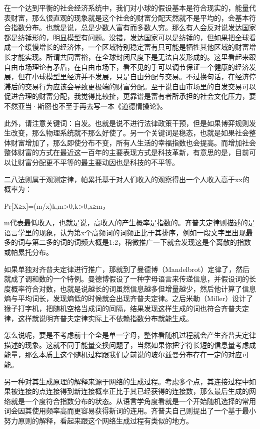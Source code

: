 \documentclass[
]{book}
\begin{document}
在一个达到平衡的社会经济系统中，我们对小球的假设基本是符合现实的，能量代表财富，那么很直观的现象就是这个社会的财富分配天然就不是平均的，会基本符合指数分布。也就是说，总是少数人富有而多数人穷。那么有人会反对说发达国家都是纺锤形的，明显模型有问题。没错，发达国家可以是纺锤的，但如果把全球看成一个缓慢增长的经济体，一个区域特别稳定富有只可能是牺牲其他区域的财富增长才能实现。所谓共同富裕，在全球封闭尺度下是无法自发形成的。这里看起来跟自由市场理论有矛盾，在自由市场下，看不见的手可以调节保证一个健康的经济发展，但在小球模型里经济并不发展，只是自由分配与交易。不过换句话，在经济停滞后的交易行为应该会导致更极端的财富分配。至于说自由市场里的自发交易可以促进合理的财富分配，我觉得比较扯，更靠谱是富有者所承担的社会文化压力，要不然亚当·斯密也不至于再去写一本《道德情操论》。

此外，请注意关键词：自发。也就是说不进行法律政策干预，但是如果博弈规则发生改变，那么物理系统就不那么好使了。另一个关键词是稳态，也就是如果社会整体财富增加了，那么即使分布不变，所有人生活的幸福指数也会提高。而增加社会整体财富的方式在最近这一百年的主要表现方式是科技革新，有意思的是，目前可以让财富分配更不平等的最主要动因也是科技的不平等。

二八法则属于观测定律，帕累托基于对人们收入的观察得出一个人收入高于xx的概率为：

Pr{[}X≥x{]}=(m/x)k,m\textgreater0,k\textgreater0,x≥m，

m代表最低收入，也就是说，高收入的产生概率是指数的。齐普夫定律则描述的是语言学里的现象，认为第x个高频词的词频正比于其排序，例如一段文字里出现最多的词与第二多的词的词频大概是1:2，稍微推广一下就会发现这是个离散的指数或帕累托分布。

如果单独对齐普夫定律进行推广，那就到了曼德博（Mandelbrot）定律了，然后就成了调和数的一个特例。曼德博假设了一种字母语言来传递信息，并假设词的长度概率符合对数，也就是说越长的词虽然信息越多但增量越少，然后他计算了信息熵与平均词长，发现熵低的时候就会出现齐普夫定律。之后米勒（Miller）设计了猴子打字机，把随机空格当成词的间隔，结果发现这样生成的词也符合齐普夫定律，这样就说明齐普夫定律实际上不依赖指数分布就能生成。

怎么说呢，要是不考虑前十个全是单一字母，整体看随机过程就会产生齐普夫定律描述的现象。这就不同于能量交换问题了，当然如果你把字符长短的信息量考虑成能量，那么本质上这个随机过程跟我们之前说的玻尔兹曼分布存在一定的对应可能。

另一种对其生成原理的解释来源于网络的生成过程。考虑多个点，其连接过程中如果被连接的点连接得到新连接概率正比于其已经获得的连接数，那么最后生成的网络就是一个度符合指数分布的状态。从语言学角度看就是一个开始随机选择的常用词会因其使用频率高而更容易获得新词的连用。齐普夫自己则提出了一个基于最小努力原则的解释，看起来跟这个网络生成过程有类似的地方。
\end{document}
